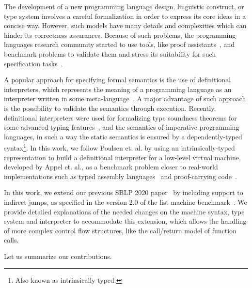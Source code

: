 \documentclass[review]{elsarticle}
\theoremstyle{definition}
\begin{document}
The development of a new programming language design, linguistic construct,
or type system involves a careful formalization in order to express
its core ideas in a concise way. However, such models have many details
and complexities which can hinder its correctness assurances.
Because of such problems, the programming languages research community
started to use tools, like proof assistants~\cite{Stump16,Chlipala13},
and benchmark problems to validate them and stress its suitability for
such specification tasks~\cite{Aydemir05,Pientka18,Appel07}.

A popular approach for specifying formal semantics is the
use of definitional interpreters, which represents the meaning of a
programming language as an interpreter written in some
meta-language~\cite{Reynolds72}. A major advantage of such approach
is the possibility to validate the semantics through execution.
Recently, definitional interpreters were used for formalizing type
soundness theorems for some advanced typing features~\cite{Amin17},
and the semantics of imperative programming languages, in such a way the static
semantics is ensured by a dependently-typed
syntax\footnote{Also known as intrinsically-typed.}\cite{Poulsen18}.
In this work, we follow Poulsen et. al. by using an intrinsically-typed
representation to build a definitional interpreter for a low-level virtual
machine, developed by Appel et. al., as a benchmark problem closer to
real-world implementations such as typed assembly languages~\cite{CraryM99} and
proof-carrying code~\cite{Necula97}.

In this work, we extend our previous SBLP 2020 paper~\cite{Feitosa2020} by including support to
indirect jumps, as specified in the version 2.0 of the list
machine benchmark~\cite{AppelDL12}. We provide detailed explanations of the needed
changes on the machine syntax, type system and interpreter to accommodate this extension, which
allows the handling of more complex control flow structures, like the call/return model of function calls.

Let us summarize our contributions. %
\end{document}
